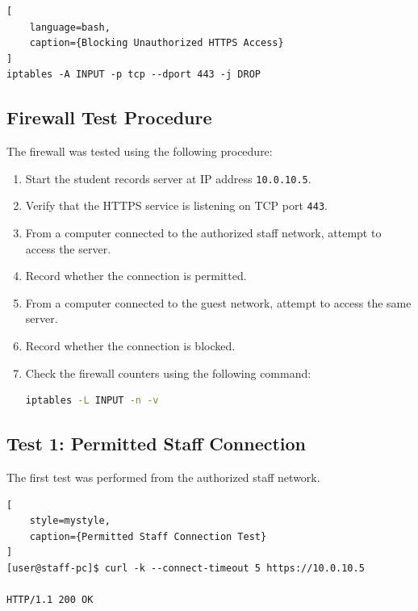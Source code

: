 \documentclass[12pt,a4paper]{article}
\begin{document}
\begin{lstlisting}[
    language=bash,
    caption={Blocking Unauthorized HTTPS Access}
]
iptables -A INPUT -p tcp --dport 443 -j DROP
\end{lstlisting}

\subsection{Firewall Test Procedure}

The firewall was tested using the following procedure:

\begin{enumerate}

    \item Start the student records server at IP address \texttt{10.0.10.5}.

    \item Verify that the HTTPS service is listening on TCP port \texttt{443}.

    \item From a computer connected to the authorized staff network, attempt to access the server.

    \item Record whether the connection is permitted.

    \item From a computer connected to the guest network, attempt to access the same server.

    \item Record whether the connection is blocked.

    \item Check the firewall counters using the following command:

\begin{lstlisting}[language=bash]
iptables -L INPUT -n -v
\end{lstlisting}

\end{enumerate}

\subsection{Test 1: Permitted Staff Connection}

The first test was performed from the authorized staff network.

\begin{lstlisting}[
    style=mystyle,
    caption={Permitted Staff Connection Test}
]
[user@staff-pc]$ curl -k --connect-timeout 5 https://10.0.10.5

HTTP/1.1 200 OK
\end{lstlisting}
\end{document}
